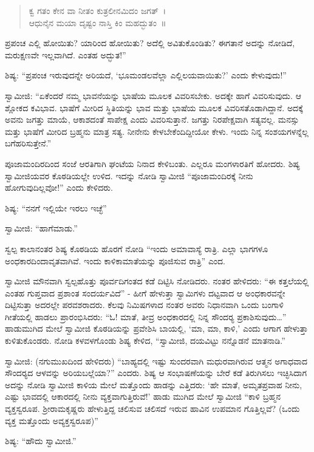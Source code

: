 \begin{verse}
ಕ್ವ ಗತಂ ಕೇನ ವಾ ನೀತಂ ಕುತ್ರಲೀನಮಿದಂ ಜಗತ್~।\\ಆಧುನೈನ ಮಯಾ ದೃಷ್ಟಂ ನಾಸ್ತಿ ಕಿಂ ಮಹದ್ಭುತಂ~॥ 
\end{verse}

 ಪ್ರಪಂಚ ಎಲ್ಲಿ ಹೋಯಿತು? ಯಾರಿಂದ ಹೋಯಿತು? ಅದೆಲ್ಲಿ ಅವಿತುಕೊಂಡಿತು? ಈಗತಾನೆ ಅದನ್ನು ನೋಡಿದೆ, ಮರುಕ್ಷಣವೇ ಇಲ್ಲವಾಗಿದೆ. ಎಂತಹ ಅದ್ಭುತ!” 

 ಶಿಷ್ಯ: “ಪ್ರಪಂಚ ಇರುವುದನ್ನೇ ಅರಿಯದೆ, ‘ಭೂಮಂಡಲವೆಲ್ಲಾ ಎಲ್ಲಿಲಯವಾಯಿತು?’ ಎಂದು ಕೇಳುವುದು!” 

 ಸ್ವಾಮೀಜಿ: “ಏಕೆಂದರೆ ನಮ್ಮ ಭಾವನೆಯನ್ನು ಭಾಷೆಯ ಮೂಲಕ ವಿವರಿಸಬೇಕು. ಅದಕ್ಕೇ ಹಾಗೆ ವಿವರಿಸುವುದು. ಆ ಶ್ಲೋಕದ ಕವಿಭಾವ. ಭಾಷೆಗೆ ಮೀರಿದ ಸ್ಥಿತಿಯನ್ನು ಭಾವ ಮತ್ತು ಭಾಷೆಯ ಮೂಲಕ ವಿವರಿಸತೊಡಾಗಿದ್ದಾನೆ. ಅದಕ್ಕೆ ಅವನು ಜಗತ್ತು ಮಾಯೆ, ಆಕಾಶದಂತೆ ಸಾಪೇಕ್ಷ ಎಂದು ವಿವರಿಸುತ್ತಾನೆ. ಜಗತ್ತು ನಿರಪೇಕ್ಷವಾಗಿ ಸತ್ಯವಲ್ಲ. ಮನಸ್ಸು ಮತ್ತು ಭಾಷೆಗೆ ಮೀರಿದ ಬ್ರಹ್ಮನು ಮಾತ್ರ ಸತ್ಯ. ನೀನೇನು ಕೇಳಬೇಕೆಂದಿದ್ದೀಯೋ ಕೇಳು. ಇಂದು ನಿನ್ನ ಸಂಶಯಗಳನ್ನೆಲ್ಲ ಬಗೆಹರಿಸುತ್ತೇನೆ.” 

 ಪೂಜಾಮಂದಿರದಿಂದ ಸಂಜೆ ಆರತಿಗಾಗಿ ಘಂಟೆಯ ನಿನಾದ ಕೇಳಿಬಂತು. ಎಲ್ಲರೂ ಮಂಗಳಾರತಿಗೆ ಹೋದರು. ಶಿಷ್ಯ ಸ್ವಾಮೀಜಿಯವರ ಕೊಠಡಿಯಲ್ಲೇ ಉಳಿದ. ಇದನ್ನು ನೋಡಿ ಸ್ವಾಮೀಜಿ “ಪೂಜಾಮಂದಿರಕ್ಕೆ ನೀನು ಹೋಗುವುದಿಲ್ಲವೋ!” ಎಂದು ಕೇಳಿದರು. 

 ಶಿಷ್ಯ: “ನನಗೆ ಇಲ್ಲಿಯೇ ಇರಲು ಇಚ್ಛೆ” 

 ಸ್ವಾಮೀಜಿ: “ಹಾಗೆಮಾಡು.” 

 ಸ್ವಲ್ಪ ಕಾಲಾನಂತರ ಶಿಷ್ಯ ಕೊಠಡಿಯ ಹೊರಗೆ ನೋಡಿ “ಇಂದು ಅಮಾವಾಸ್ಯೆ ರಾತ್ರಿ. ಎಲ್ಲಾ ಭಾಗಗಳೂ ಅಂಧಕಾರದಿಂದಾವೃತವಾಗಿವೆ. ಇಂದು ಕಾಳಿಕಾಮಾತೆಯನ್ನು ಪೂಜಿಸುವ ರಾತ್ರಿ” ಎಂದ. 

 ಸ್ವಾಮೀಜಿ ಮೌನವಾಗಿ ಸ್ವಲ್ಪಹೊತ್ತು ಪೂರ್ವದಿಗಂತದ ಕಡೆ ದಿಟ್ಟಿಸಿ ನೋಡಿದರು. ನಂತರ ಹೇಳಿದರು: “ಈ ಕತ್ತಲೆಯಲ್ಲಿ ಎಂತಹ ಗುಪ್ತವಾದ ಪ್ರಶಾಂತ ಸಂದರ್ಯವಿದೆ” - ಹೀಗೆ ಹೇಳುತ್ತಾ ಸ್ವಾಮಿಗಳು ದಟ್ಟವಾದ ಆ ಅಂಧಕಾರವನ್ನೇ ದಿಟ್ಟಿಸುತ್ತಾ ಅದರಲ್ಲೇ ಪರವಶರಾದರು. ಕೆಲವು ನಿಮಿಷಗಳಾದ ನಂತರ ಅವರು ನಿಧಾನವಾಗಿ ಒಂದು ಬಂಗಾಳಿ ಗೀತೆಯಲ್ಲಿ ಹಾಡಲು ಪ್ರಾರಂಭಿಸಿದರು: “ಓ! ಮಾತೆ, ತೀವ್ರ ಅಂಧಕಾರದಲ್ಲಿ ನಿನ್ನ ಸೌಂದರ‍್ಯ ಪ್ರಕಾಶಿಸುವುದು…” ಹಾಡುಮುಗಿದ ಮೇಲೆ ಸ್ವಾಮೀಜಿ ಕೊಠಡಿಯನ್ನು ಪ್ರವೇಶಿಸಿ ಬಾಯಲ್ಲಿ, ‘ಮಾ, ಮಾ, ಕಾಳಿ,’ ಎಂದು ಆಗಾಗ ಹೇಳುತ್ತಾ ಕುಳಿತುಕೊಂಡರು. ನೋಡಿ ಕಳವಳಗೊಂಡು ಶಿಷ್ಯ ಕೇಳಿದ, “ಸ್ವಾಮೀಜಿ, ದಯವಿಟ್ಟು ನನ್ನೊಡನೆ ಮಾತನಾಡಿ.” 

 ಸ್ವಾಮೀಜಿ: (ನಗುಮುಖದಿಂದ ಹೇಳಿದರು) “ಬಾಹ್ಯದಲ್ಲಿ ಇಷ್ಟು ಸುಂದರವಾಗಿ ಮಧುರವಾಗಿರುವ ಆತ್ಮನ ಅಗಾಧವಾದ ಸೌಂದರ‍್ಯದ ಆಳವನ್ನು ಅರಿಯಬಲ್ಲೆಯಾ?” ಎಂದರು. ಶಿಷ್ಯ ಆ ಸಂಭಾಷಣೆಯನ್ನು ಬೇರೆ ಕಡೆ ತಿರುಗಿಸಲು ಇಚ್ಛಿಸಿದಾಗ ಅದನ್ನು ನೋಡಿ ಸ್ವಾಮೀಜಿ ಕಾಳಿಯ ಮೇಲೆ ಮತ್ತೊಂದು ಹಾಡನ್ನು ಎತ್ತಿದರು: ‘ಹೇ ಮಾತೆ, ಅಮೃತಪ್ರವಾಹ ನೀನು, ಎಷ್ಟು ಭಾವದಲ್ಲಿ ಆಕಾರದಲ್ಲಿ ನೀನು ವ್ಯಕ್ತವಾಗುತ್ತಿರುವೆ!’ ಹಾಡು ಮುಗಿದ ಮೇಲೆ ಸ್ವಾಮೀಜಿ “ಕಾಳಿ ಬ್ರಹ್ಮನ ವ್ಯಕ್ತಸ್ವರೂಪ. ಶ‍್ರೀರಾಮಕೃಷ್ಣರು ಹೇಳುತ್ತಿದ್ದ ಚಲಿಸುವ ಚಲಿಸದೆ ಇರುವ ಹಾವಿನ ಉಪಮಾನ ಗೊತ್ತಿಲ್ಲವೆ? (ಒಂದು ವ್ಯಕ್ತ ಮತ್ತೊಂದು ಅವ್ಯಕ್ತಸ್ವರೂಪ)” 

 ಶಿಷ್ಯ: “ಹೌದು ಸ್ವಾಮೀಜಿ.” 

